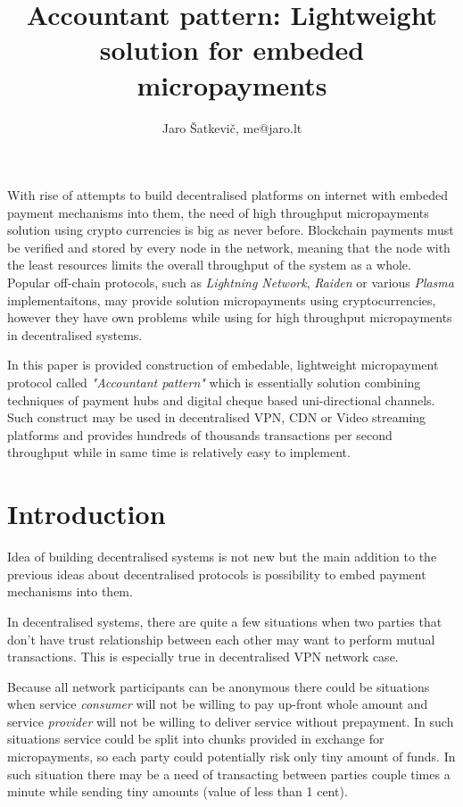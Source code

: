 \documentclass[a4paper,12pt]{article}
\title{Accountant pattern: Lightweight solution for embeded micropayments}
\author{Jaro Šatkevič, me@jaro.lt}
\begin{document}
\maketitle

With rise of attempts to build decentralised platforms on internet with embeded
payment mechanisms into them, the need of high throughput micropayments solution
using crypto currencies is big as never before. Blockchain payments must be 
verified and stored by every node in the network, meaning that the node with the 
least resources limits the overall throughput of the system as a whole. Popular 
off-chain protocols, such as \textit{Lightning Network}, \textit{Raiden} or 
various \textit{Plasma} implementaitons, may provide solution micropayments using
cryptocurrencies, however they have own problems while using for high throughput 
micropayments in decentralised systems. 

In this paper is provided construction of embedable, lightweight micropayment 
protocol called \textit{"Accountant pattern"} which is essentially solution 
combining techniques of payment hubs and digital cheque based uni-directional 
channels. Such construct may be used in decentralised VPN, CDN or Video
streaming platforms and provides hundreds of thousands transactions per second
throughput while in same time is relatively easy to implement.

\newpage
\tableofcontents
\newpage

\section{Introduction}

Idea of building decentralised systems is not new but the main addition to the 
previous ideas about decentralised protocols is possibility to embed payment 
mechanisms into them.

In decentralised systems, there are quite a few situations when two parties that
don't have trust relationship between each other may want to perform mutual 
transactions. This is especially true in decentralised VPN network case.

Because all network participants can be anonymous there could be situations when
service \textit{consumer} will not be willing to pay up-front whole amount and 
service \textit{provider} will not be willing to deliver service without 
prepayment. In such situations service could be split into chunks provided in 
exchange for micropayments, so each party could potentially risk only tiny 
amount of funds. In such situation there may be a need of transacting between 
parties couple times a minute while sending tiny amounts (value of less than 1 
cent).
\end{document}
